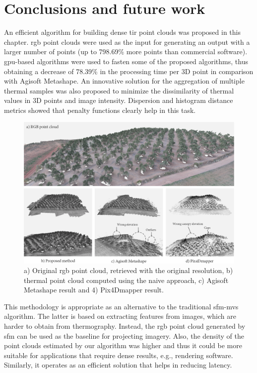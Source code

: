 \section{Conclusions and future work}
\label{Conclusions and future work}

An efficient algorithm for building dense \acrshort{tir} point clouds was proposed in this chapter. \acrshort{rgb} point clouds were used as the input for generating an output with a larger number of points (up to 798.69\% more points than commercial software). \acrshort{gpu}-based algorithms were used to fasten some of the proposed algorithms, thus obtaining a decrease of 78.39\% in the processing time per 3D point in comparison with Agisoft Metashape. An innovative solution for the aggregation of multiple thermal samples was also proposed to minimize the dissimilarity of thermal values in 3D points and image intensity. Dispersion and histogram distance metrics showed that penalty functions clearly help in this task.

\begin{figure}[htb]
    \centering
    \includegraphics[width=\linewidth]{figs/thermal_projection/thermal_visualization_comparison.png}
	\caption{a) Original \acrshort{rgb} point cloud, retrieved with the original resolution, b) thermal point cloud computed using the naive approach, c) Agisoft Metashape result and 4) Pix4Dmapper result. }
	\label{fig:thermal_point_cloud_comparison}
\end{figure}

This methodology is appropriate as an alternative to the traditional \acrshort{sfm}-\acrshort{mvs} algorithm. The latter is based on extracting features from images, which are harder to obtain from thermography. Instead, the \acrshort{rgb} point cloud generated by \acrshort{sfm} can be used as the baseline for projecting imagery. Also, the density of the point clouds estimated by our algorithm was higher and thus it could be more suitable for applications that require dense results, e.g., rendering software. Similarly, it operates as an efficient solution that helps in reducing latency.

